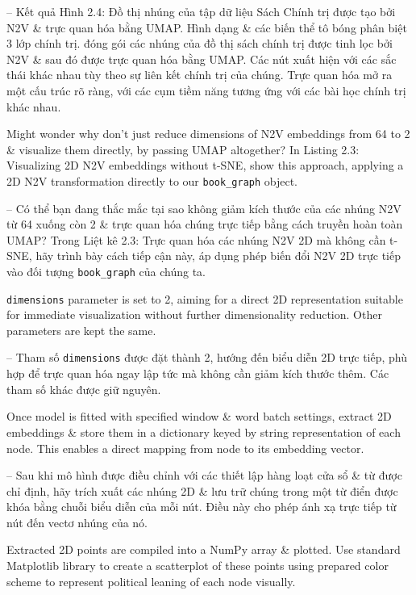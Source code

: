 \documentclass{article}
\begin{document}
\begin{itemize}
\begin{itemize}
\begin{itemize}
           -- Kết quả {\sf Hình 2.4: Đồ thị nhúng của tập dữ liệu Sách Chính trị được tạo bởi N2V \& trực quan hóa bằng UMAP. Hình dạng \& các biến thể tô bóng phân biệt 3 lớp chính trị.} đóng gói các nhúng của đồ thị sách chính trị được tinh lọc bởi N2V \& sau đó được trực quan hóa bằng UMAP. Các nút xuất hiện với các sắc thái khác nhau tùy theo sự liên kết chính trị của chúng. Trực quan hóa mở ra một cấu trúc rõ ràng, với các cụm tiềm năng tương ứng với các bài học chính trị khác nhau.

           Might wonder why don't just reduce dimensions of N2V embeddings from 64 to 2 \& visualize them directly, by passing UMAP altogether? In {\sf Listing 2.3: Visualizing 2D N2V embeddings without t-SNE}, show this approach, applying a 2D N2V transformation directly to our \verb|book_graph| object.

           -- Có thể bạn đang thắc mắc tại sao không giảm kích thước của các nhúng N2V từ 64 xuống còn 2 \& trực quan hóa chúng trực tiếp bằng cách truyền hoàn toàn UMAP? Trong {\sf Liệt kê 2.3: Trực quan hóa các nhúng N2V 2D mà không cần t-SNE}, hãy trình bày cách tiếp cận này, áp dụng phép biến đổi N2V 2D trực tiếp vào đối tượng \verb|book_graph| của chúng ta.

           {\tt dimensions} parameter is set to 2, aiming for a direct 2D representation  suitable for immediate visualization without further dimensionality reduction. Other parameters are kept the same.

           -- Tham số {\tt dimensions} được đặt thành 2, hướng đến biểu diễn 2D trực tiếp, phù hợp để trực quan hóa ngay lập tức mà không cần giảm kích thước thêm. Các tham số khác được giữ nguyên.

           Once model is fitted with specified window \& word batch settings, extract 2D embeddings \& store them in a dictionary keyed by string representation of each node. This enables a direct mapping from node to its embedding vector.

           -- Sau khi mô hình được điều chỉnh với các thiết lập hàng loạt cửa sổ \& từ được chỉ định, hãy trích xuất các nhúng 2D \& lưu trữ chúng trong một từ điển được khóa bằng chuỗi biểu diễn của mỗi nút. Điều này cho phép ánh xạ trực tiếp từ nút đến vectơ nhúng của nó.

           Extracted 2D points are compiled into a NumPy array \& plotted. Use standard Matplotlib library to create a scatterplot of these points using prepared color scheme to represent political leaning of each node visually.


\end{itemize}
\end{itemize}
\end{itemize}
\end{document}
